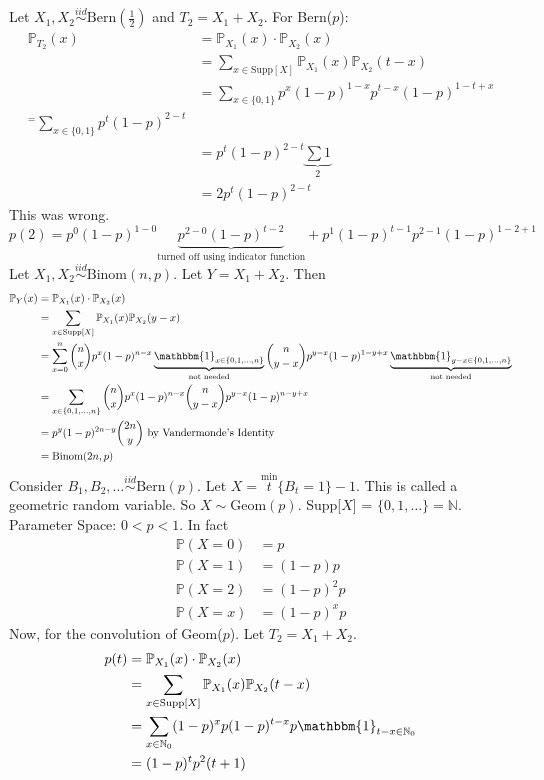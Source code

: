 \documentclass[12pt]{article}
\newcommand{\prob}[1]{\mathbb{P}(#1)}
\newcommand{\probsub}[2]{\mathbb{P}_{#1}(#2)}
\newcommand{\indicator}[1]{\mathbbm{1}_{#1}}
\begin{document}
Let $X_1, X_2 \stackrel{iid}{\sim} \text{Bern}(\frac{1}{2})$ and $T_2 = X_1 + X_2$. For Bern($p$): $$\begin{aligned} \probsub{T_2}{x} &= \probsub{X_1}{x}\cdot\probsub{X_2}{x} \\ &= \sum_{x \in \text{Supp}[X]} \probsub{X_1}{x}\probsub{X_2}{t - x} \\ &= \sum_{x \in \{0, 1\}} p^x(1 - p)^{1 - x} p^{t - x}(1 - p)^{1 - t + x} \\ ^= \sum_{x \in \{0, 1\}} p^t(1 - p)^{2 - t} \\ &= p^t(1 - p)^{2 - t} \underbrace{\sum 1}_2 \\ &= 2p^t(1 - p)^{2 - t} \end{aligned} $$ This was wrong. 
$$p(2) = p^0(1 - p)^{1 - 0} \underbrace{p^{2 - 0}(1 - p)^{t - 2}}_{\text{turned off using indicator function}} + p^1(1 - p)^{t - 1}p^{2 - 1}(1 - p)^{1 - 2 + 1} $$ 
Let $X_1, X_2 \stackrel{iid}{\sim} \text{Binom}(n, p)$. Let $Y = X_1 + X_2$. Then $$\begin{aligned} \probsub{Y}{x} &= \probsub{X_1}{x} \cdot \probsub{X_2}{x} \\ &= \sum_{x \in \text{Supp}[X]} \probsub{X_1}{x}\probsub{X_2}{y - x} \\ &= \sum_{x = 0}^n \binom{n}{x}p^x(1 - p)^{n - x}\underbrace{\indicator{x \in \{0, 1, \dots, n\}}}_{\text{not needed}} \binom{n}{y- x} p^{y - x}(1 - p)^{1 - y + x} \underbrace{\indicator{y -x \in \{0, 1, \dots, n\}}}_{\text{not needed}} \\ &= \sum_{x \in \{0, 1, \dots, n\}} \binom{n}{x}p^x(1 - p)^{n- x} \binom{n}{y - x}p^{y - x}(1 - p)^{n - y + x} \\ &= p^y(1 - p)^{2n - y} \binom{2n}{y} \text{ by Vandermonde's Identity} \\ 
&= \text{Binom}(2n, p) \end{aligned} $$ 
Consider $B_1, B_2, \dots \stackrel{iid}{\sim} \text{Bern}(p)$. Let $X = \stackrel{\text{min}}{t} \{B_t = 1\} - 1$. This is called a geometric random variable. So $X \sim \text{Geom}(p)$. Supp[$X$] = $\{0, 1, \dots\} = \mathbb{N}$. Parameter Space: $0 < p < 1$. In fact $$ \begin{aligned} 
\prob{X = 0} &= p \\ \prob{X = 1} &= (1 - p)p \\ \prob{X = 2} &= (1 - p)^2p \\ \prob{X = x} &= (1 - p)^xp \end{aligned} $$ 
Now, for the convolution of Geom($p$). Let $T_2 = X_1 + X_2$. $$\begin{aligned} p(t) &= \probsub{X_1}{x} \cdot \probsub{X_2}{x} \\ &= \sum_{x \in \text{Supp}[X]} \probsub{X_1}{x} \probsub{X_2}{t - x} \\ &= \sum_{x \in \mathbb{N}_0} (1 - p)^xp(1 - p)^{t - x}p\indicator{t - x \in \mathbb{N}_0} \\ &= (1 - p)^tp^2(t + 1) \end{aligned} $$ 
\end{document}
